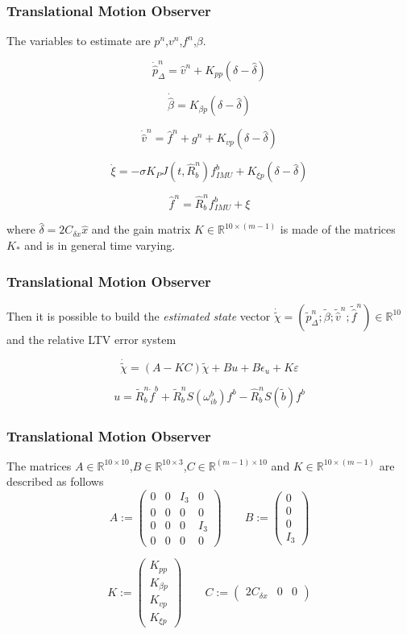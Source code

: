 \documentclass{beamer}
\begin{document}
	\begin{frame}
		\frametitle{Translational Motion Observer}
		The variables to estimate are $p^n$,$v^n$,$f^n$,$\beta$.
		
		\[ \dot{\hat{p}}^n_\Delta = \hat{v}^n + K_{pp}(\delta - \hat{\delta})  \]
		
		\[ \dot{\hat{\beta}} = K_{\beta p} (\delta - \hat{\delta}) \]
		
		\[ \dot{\hat{v}}^n = \hat{f}^n + g^n + K_{vp}(\delta - \hat{\delta})\]
		
		\[ \dot{\xi} = - \sigma K_P J(t, \hat{R}^n_b)f^b_{IMU} + K_{\xi p}(\delta - \hat{\delta}) \]
		
		\[ \hat{f}^n = \hat{R}^n_b f^b_{IMU} + \xi  \]
		
		where $\hat{\delta} = 2C_{\delta x}\hat{x}$ and the gain matrix $K \in \mathds{R}^{10\times(m-1)}$ is made of the matrices $K_*$ and is in general time varying.
	\end{frame}

	\begin{frame}
		\frametitle{Translational Motion Observer}
		Then it is possible to build the \textit{estimated state} vector $\dot{\tilde{\chi}} = (\tilde{p}^n_\Delta;\tilde{\beta}; \tilde{\hat{v}}^n; \tilde{\hat{f}}^n) \in \mathds{R}^{10}$ and the relative LTV error system
		
		\[ \dot{\tilde{\chi}} = (A - KC)\tilde{\chi} + Bu + B\epsilon_u + K\varepsilon\]
		
		\[ u = \tilde{R}^n_b \dot{f}^b + \tilde{R}^n_b S(\omega^b_{ib})f^b - \hat{R}^n_b S(\tilde{b})f^b\]
	\end{frame}

	\begin{frame}
		\frametitle{Translational Motion Observer}
		The matrices $A \in \mathbb{R}^{10\times 10}$,$B \in \mathbb{R}^{10\times 3}$,$C \in \mathds{R}^{(m-1) \times 10} $ and $K \in \mathds{R}^{10 \times (m-1)}$ are described as follows
		$$
		A :=
		\begin{pmatrix}
		0 & 0 & I_3 & 0 \\ 
		0 & 0 & 0 & 0 \\
		0 & 0 & 0 & I_3 \\
		0 & 0 & 0 & 0
		\end{pmatrix}
		\qquad
		B := 
		\begin{pmatrix}
		0 \\ 0 \\ 0 \\ I_3
		\end{pmatrix}
		$$
		
		$$
		K := 
		\begin{pmatrix}
		K_{pp} \\ K_{\beta p} \\ K_{vp} \\ K_{\xi p}
		\end{pmatrix}
		\qquad
		C :=
		\begin{pmatrix}
		2C_{\delta x} & 0 & 0
		\end{pmatrix}
		$$
	\end{frame}
\end{document}
